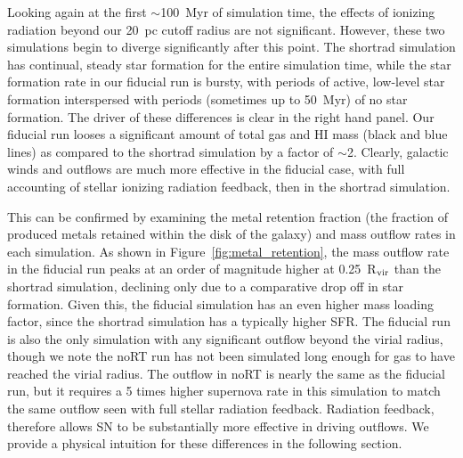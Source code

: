 \documentclass[twocolumn]{aastex62}
\begin{document}
Looking again at the first $\sim$100~Myr of simulation time, the effects of ionizing radiation beyond our 20~pc cutoff radius are not significant. However, these two simulations begin to diverge significantly after this point. The shortrad simulation has continual, steady star formation for the entire simulation time, while the star formation rate in our fiducial run is bursty, with periods of active, low-level star formation interspersed with periods (sometimes up to 50~Myr) of no star formation. The driver of these differences is clear in the right hand panel. Our fiducial run looses a significant amount of total gas and HI mass (black and blue lines) as compared to the shortrad simulation by a factor of $\sim$2. Clearly, galactic winds and outflows are much more effective in the fiducial case, with full accounting of stellar ionizing radiation feedback, then in the shortrad simulation.

This can be confirmed by examining the metal retention fraction (the fraction of produced metals retained within the disk of the galaxy) and mass outflow rates in each simulation. As shown in Figure~\ref{fig:metal_retention}, the mass outflow rate in the fiducial run peaks at an order of magnitude higher at 0.25~R$_{\rm vir}$ than the shortrad simulation, declining only due to a comparative drop off in star formation. Given this, the fiducial simulation has an even higher mass loading factor, since the shortrad simulation has a typically higher SFR. The fiducial run is also the only simulation with any significant outflow beyond the virial radius, though we note the noRT run has not been simulated long enough for gas to have reached the virial radius. The outflow in noRT is nearly the same as the fiducial run, but it requires a 5 times higher supernova rate in this simulation to match the same outflow seen with full stellar radiation feedback. Radiation feedback, therefore allows SN to be substantially more effective in driving outflows. We provide a physical intuition for these differences in the following section.
\end{document}
